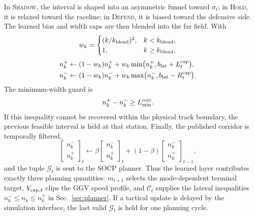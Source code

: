 \documentclass{iopjournal}
\begin{document}
In \textsc{Shadow}, the interval is shaped into an asymmetric funnel toward
$\sigma_t$; in \textsc{Hold}, it is relaxed toward the raceline; in
\textsc{Defend}, it is biased toward the defensive side.  The learned bias
and width caps are then blended into the far field.  With
\begin{equation}
w_k=
\begin{cases}
(k/k_{\rm blend})^2, & k<k_{\rm blend},\\
1, & k\ge k_{\rm blend},
\end{cases}
\label{eq:rl_blend_w}
\end{equation}
\begin{align}
n_k^+ &\leftarrow (1-w_k)n_k^+
+w_k\min\bigl(n_k^+,b_{\rm lat}+L_t^{\rm cap}\bigr),
\label{eq:rl_blend_max}\\
n_k^- &\leftarrow (1-w_k)n_k^-
+w_k\max\bigl(n_k^-,b_{\rm lat}-R_t^{\rm cap}\bigr).
\label{eq:rl_blend_min}
\end{align}
The minimum-width guard is
\begin{equation}
n_k^+-n_k^- \ge L_{\min}^{\rm corr}.
\label{eq:min_corridor_width}
\end{equation}
If this inequality cannot be recovered within the physical track boundary,
the previous feasible interval is held at that station.  Finally, the
published corridor is temporally filtered,
\begin{equation}
\begin{bmatrix}n_k^-\\n_k^+\end{bmatrix}_{t}
\leftarrow
\beta
\begin{bmatrix}n_k^-\\n_k^+\end{bmatrix}_{t}
+(1-\beta)
\begin{bmatrix}n_k^-\\n_k^+\end{bmatrix}_{t-1},
\label{eq:ema}
\end{equation}
and the tuple $\mathcal{G}_t$ is sent to the SOCP planner.  Thus the learned
layer contributes exactly three planning quantities: $m_{t+1}$ selects the
mode-dependent terminal target, $V_{{\rm cap},t}$ clips the GGV speed profile,
and $\mathcal{C}_t$ supplies the lateral inequalities
$n_k^-\le n_k\le n_k^+$ in Sec.~\ref{sec:planner}.  If a tactical update is
delayed by the simulation interface, the last valid $\mathcal{G}_t$ is
held for one planning cycle.

\end{document}
